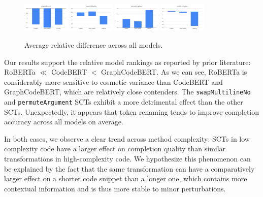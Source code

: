 \documentclass[usenames,dvipsnames]{article} %
\begin{document}
  \vspace{-10pt}\begin{figure}[H]
                  \centering
                  \includegraphics[width=0.20\textwidth]{figs/renameTokens.png}
                  \includegraphics[width=0.20\textwidth]{figs/swapMultilineNo.png}
                  \includegraphics[width=0.20\textwidth]{figs/permuteArgument.png}
                  \includegraphics[width=0.20\textwidth]{figs/addExtraLogging.png}
                  \caption{Average relative difference across all models.}
                  \label{fig:dataflow}
  \end{figure}

  Our results support the relative model rankings as reported by prior literature: RoBERTa $\ll$ CodeBERT $<$ GraphCodeBERT. As we can see, RoBERTa is considerably more sensitive to cosmetic variance than CodeBERT and GraphCodeBERT, which are relatively close contenders. The \lstinline|swapMultilineNo| and \lstinline|permuteArgument| SCTs exhibit a more detrimental effect than the other SCTs. Unexpectedly, it appears that token renaming tends to improve completion accuracy across all models on average.

  In both cases, we observe a clear trend across method complexity: SCTs in low complexity code have a larger effect on completion quality than similar transformations in high-complexity code. We hypothesize this phenomenon can be explained by the fact that the same transformation can have a comparatively larger effect on a shorter code snippet than a longer one, which contains more contextual information and is thus more stable to minor perturbations.
\end{document}
